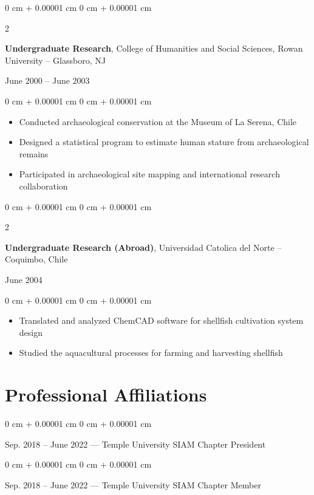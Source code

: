 \documentclass[10pt, letterpaper]{article}
\newenvironment{highlights}{
    \begin{itemize}[
        topsep=0.10 cm,
        parsep=0.10 cm,
        partopsep=0pt,
        itemsep=0pt,
        leftmargin=0 cm + 10pt
    ]
}{
    \end{itemize}
} %
\newenvironment{onecolentry}{
    \begin{adjustwidth}{
        0 cm + 0.00001 cm
    }{
        0 cm + 0.00001 cm
    }
}{
    \end{adjustwidth}
} %
\newenvironment{twocolentry}[2][]{
    \onecolentry
    \def\secondColumn{#2}
    \setcolumnwidth{\fill, 4.5 cm}
    \begin{paracol}{2}
}{
    \switchcolumn \raggedleft \secondColumn
    \end{paracol}
    \endonecolentry
} %
\begin{document}
\vspace{0.2 cm}

\begin{twocolentry}{
    June 2000 – June 2003
}
    \textbf{Undergraduate Research}, College of Humanities and Social Sciences, Rowan University -- Glassboro, NJ
\end{twocolentry}

\vspace{0.10 cm}
\begin{onecolentry}
    \begin{highlights}
        \item Conducted archaeological conservation at the Museum of La Serena, Chile
        \item Designed a statistical program to estimate human stature from archaeological remains
        \item Participated in archaeological site mapping and international research collaboration
    \end{highlights}
\end{onecolentry}

\vspace{0.2 cm}

\begin{twocolentry}{
    June 2004
}
    \textbf{Undergraduate Research (Abroad)}, Universidad Catolica del Norte -- Coquimbo, Chile
\end{twocolentry}

\vspace{0.10 cm}
\begin{onecolentry}
    \begin{highlights}
        \item Translated and analyzed ChemCAD software for shellfish cultivation system design
        \item Studied the aquacultural processes for farming and harvesting shellfish
    \end{highlights}
\end{onecolentry}

\section{Professional Affiliations}

\begin{onecolentry}
    Sep. 2018 – June 2022 — Temple University SIAM Chapter President
\end{onecolentry}

\begin{onecolentry}
    Sep. 2018 – June 2022 — Temple University SIAM Chapter Member
\end{onecolentry}
\end{document}
